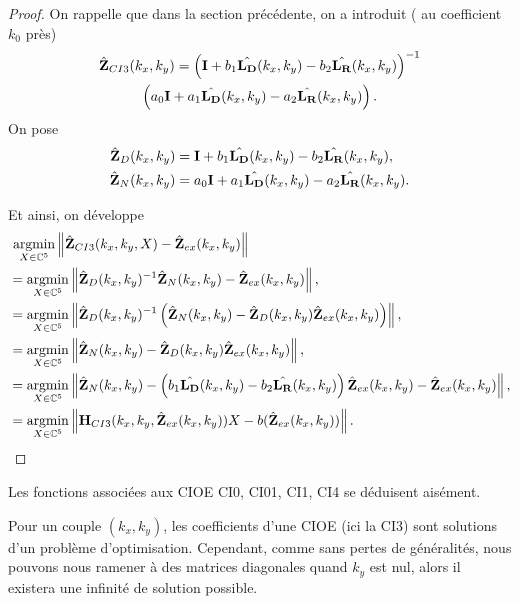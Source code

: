     \begin{proof}
      On rappelle que dans la section précédente, on a introduit ( au coefficient \(k_0\) près)
      \begin{multline*}
        \hat{\mathbf{Z}}_{CI3}(k_x,k_y) = \left(\mathbf{I} + b_1 \hat{\mathbf{L_D}}(k_x,k_y) - b_2 \hat{\mathbf{L_R}}(k_x,k_y) \right)^{-1}\\\left(a_0 \mathbf{I} + a_1 {\hat{\mathbf{L_D}}(k_x,k_y)} - a_2 {\hat{\mathbf{L_R}}(k_x,k_y)}\right).
      \end{multline*}
      On pose
      \begin{align*}
        \hat{\mathbf{Z}}_D(k_x,k_y) &= \mathbf{I} + b_1 \hat{\mathbf{L_D}}(k_x,k_y) - b_2 \hat{\mathbf{L_R}}(k_x,k_y),
        \\
        \hat{\mathbf{Z}}_N(k_x,k_y) &= a_0 \mathbf{I} + a_1 {\hat{\mathbf{L_D}}(k_x,k_y)} - a_2 {\hat{\mathbf{L_R}}(k_x,k_y)}.
      \end{align*}

      Et ainsi, on développe
      \begin{align*}
      &{}~ {\underset{X\in\mathbb C^5}{\operatorname{argmin}}} \left\lVert\hat{\mathbf{Z}}_{CI3}(k_x,k_y,X) - \hat{\mathbf{Z}}_{ex}(k_x,k_y)\right\rVert
      \\
      & = {\underset{X\in\mathbb C^5}{\operatorname{argmin}}} \left\lVert\hat{\mathbf{Z}}_D(k_x,k_y)^{-1}\hat{\mathbf{Z}}_N(k_x,k_y) - \hat{\mathbf{Z}}_{ex}(k_x,k_y) \right\rVert,
      \\
      &= {\underset{X\in\mathbb C^5}{\operatorname{argmin}}} \left\lVert\hat{\mathbf{Z}}_D(k_x,k_y)^{-1}\left(\hat{\mathbf{Z}}_N(k_x,k_y) - \hat{\mathbf{Z}}_D(k_x,k_y)\hat{\mathbf{Z}}_{ex}(k_x,k_y)\right) \right\rVert,
      \\
      &= {\underset{X\in\mathbb C^5}{\operatorname{argmin}}} \left\lVert\hat{\mathbf{Z}}_N(k_x,k_y) - \hat{\mathbf{Z}}_D(k_x,k_y)\hat{\mathbf{Z}}_{ex}(k_x,k_y)\right\rVert,
      \\
      &= {\underset{X\in\mathbb C^5}{\operatorname{argmin}}} \left\lVert\hat{\mathbf{Z}}_N(k_x,k_y) - \left(b_1 \hat{\mathbf{L_D}}(k_x,k_y) - b_2 \hat{\mathbf{L_R}}(k_x,k_y)\right)\hat{\mathbf{Z}}_{ex}(k_x,k_y) - \hat{\mathbf{Z}}_{ex}(k_x,k_y) \right\rVert,
      \\
      &= {\underset{X\in\mathbb C^5}{\operatorname{argmin}}} \left\lVert\mathbf{H}_{CI3}(k_x,k_y,\hat{\mathbf{Z}}_{ex}(k_x,k_y))X - b(\hat{\mathbf{Z}}_{ex}(k_x,k_y))\right\rVert.
      \end{align*}
    \end{proof}

    Les fonctions associées aux CIOE CI0, CI01, CI1, CI4 se déduisent aisément.

    Pour un couple \((k_x,k_y)\), les coefficients d'une CIOE (ici la CI3) sont solutions d'un problème d'optimisation.
    Cependant, comme sans pertes de généralités, nous pouvons nous ramener à des matrices diagonales quand \(k_y\) est nul, alors il existera une infinité de solution possible.
 
